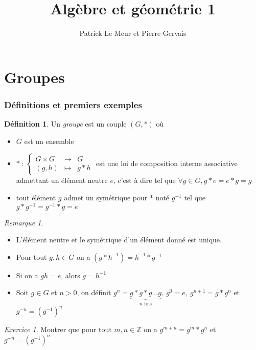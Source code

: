 \documentclass[]{article}
\title{Algèbre et géométrie 1}
\author{Patrick Le Meur et Pierre Gervais}
\theoremstyle{remark}
\newtheorem{myrem}{Remarque}
\newtheorem{myexer}{Exercice}
\theoremstyle{definition}
\newtheorem{mydef}{Définition}
\newcommand{\func}[5]{
#1 ~ : ~ \left\{ \begin{array}{lcl}
	#2 & \longrightarrow & #3 \\
	#4 & \longmapsto & #5
\end{array}
\right.
}
\begin{document}
\maketitle

\tableofcontents

\part{Groupes}

\section{Définitions et premiers exemples}

\begin{mydef}
	Un \textit{groupe} est un couple $(G, *)$ où
	\begin{itemize}
		\item $G$ est un ensemble
		\item $\func{*}{G \times G}{G}{(g,h)}{g*h}$ est une loi de composition interne associative admettant un élément neutre $e$, c'est à dire tel que $\forall g \in G, g * e = e * g = g$
		\item tout élément $g$ admet un symétrique pour $*$ noté $g^{-1}$ tel que $g*g^{-1}=g^{-1}*g=e$
	\end{itemize}
\end{mydef}

\begin{myrem}
\leavevmode
\begin{itemize}
	\item L'élément neutre et le symétrique d'un élément donné est unique.
	\item Pour tout $g, h \in G$ on a $(g*h^{-1})=h^{-1}*g^{-1}$
	\item Si on a $gh=e$, alors $g=h^{-1}$
	\item Soit $g \in G$ et $n > 0$, on définit $g^n=\underbrace{g*g*g...g}_{n \text{ fois}}, ~ g^0=e, ~ g^{n+1}=g*g^n$ et $g^{-n}=\left(g^{-1}\right)^{n}$
\end{itemize}
\end{myrem}

\begin{myexer}
Montrer que pour tout $m, n \in \mathbb{Z}$ on a $g^{m+n}=g^m*g^n$ et $g^{-n}=\left(g^{-1}\right)^n$
\end{myexer}
\end{document}
